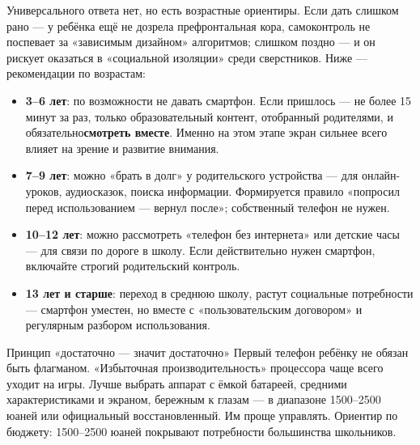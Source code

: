 


Универсального ответа нет, но есть возрастные ориентиры. Если дать слишком рано — у ребёнка ещё не дозрела префронтальная кора, самоконтроль не поспевает за «зависимым дизайном» алгоритмов; слишком поздно — и он рискует оказаться в «социальной изоляции» среди сверстников. Ниже — рекомендации по возрастам:

\begin{itemize}
  \item \textbf{3–6 лет}: по возможности не давать смартфон. Если пришлось — не более 15 минут за раз, только образовательный контент, отобранный родителями, и обязательно\textbf{смотреть вместе}. Именно на этом этапе экран сильнее всего влияет на зрение и развитие внимания.
  \item \textbf{7–9 лет}: можно «брать в долг» у родительского устройства — для онлайн-уроков, аудиосказок, поиска информации. Формируется правило «попросил перед использованием — вернул после»; собственный телефон не нужен.
  \item \textbf{10–12 лет}: можно рассмотреть «телефон без интернета» или детские часы — для связи по дороге в школу. Если действительно нужен смартфон, включайте строгий родительский контроль.
  \item \textbf{13 лет и старше}: переход в среднюю школу, растут социальные потребности — смартфон уместен, но вместе с «пользовательским договором» и регулярным разбором использования.
\end{itemize}

\begin{tcbinfo}{Принцип «достаточно — значит достаточно»}
Первый телефон ребёнку не обязан быть флагманом. «Избыточная производительность» процессора чаще всего уходит на игры. Лучше выбрать аппарат с ёмкой батареей, средними характеристиками и экраном, бережным к глазам — в диапазоне 1500–2500 юаней или официальный восстановленный. Им проще управлять. Ориентир по бюджету: 1500–2500 юаней покрывают потребности большинства школьников.

\end{tcbinfo}


